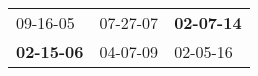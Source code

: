 \begin{supertabular}{p{0.33\columnwidth}p{0.33\columnwidth}p{0.33\columnwidth}}
          09-16-05\textsuperscript{} &  07-27-07\textsuperscript{} &  \textbf{02-07-14\textsuperscript{}} \\
 \textbf{02-15-06\textsuperscript{}} &  04-07-09\textsuperscript{} &           02-05-16\textsuperscript{} \\
\end{supertabular}
